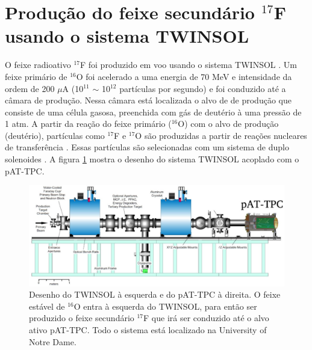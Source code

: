 \documentclass[a4paper,12pt,oneside]{book}
\begin{document}
\section{Produção do feixe secundário $^{17}$F usando o sistema TWINSOL}\label{sec:twinsol}

\par O feixe radioativo $^{17}$F foi produzido em voo usando o sistema TWINSOL \cite{KOLATA1989503, NDtandem}. Um feixe primário de $^{16}$O foi acelerado a uma energia de 70 MeV e intensidade da ordem de 200 $\mu$A (10$^{11}$ $\sim$ 10$^{12}$ partículas por segundo) e foi conduzido até a câmara de produção. Nessa câmara está localizada o alvo de de produção que consiste de uma célula gasosa, preenchida com gás de deutério à uma pressão de 1 atm. A partir da reação do feixe primário ($^{16}$O) com o alvo de produção (deutério), partículas como $^{17}$F e $^{17}$O são produzidas a partir de reações nucleares de transferência \cite{KOLATA1989503, twinsol}. Essas partículas são selecionadas com um sistema de duplo solenoides \cite{twinsol, ribras_leo}. A figura \ref{fig:twinsol+pattpc} mostra o desenho do sistema TWINSOL acoplado com o pAT-TPC.


\begin{figure}[H]
    \centering
    \includegraphics[scale = 0.35]{figs/poster3.jpeg}
    \caption{Desenho do TWINSOL à esquerda e do pAT-TPC à direita. O feixe estável de $^{16}$O entra à esquerda do TWINSOL, para então ser produzido o feixe secundário $^{17}$F que irá ser conduzido até o alvo ativo pAT-TPC. Todo o sistema está localizado na University of Notre Dame.}
    \label{fig:twinsol+pattpc}
\end{figure}
\end{document}
